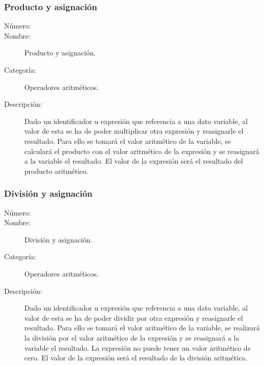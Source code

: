 \subsubsection{Producto y asignación}
\begin{framed}
	\begin{description}
		\item [Número:] \cn
		\item [Nombre:] Producto y asignación.
		\item [Categoría:] Operadores aritméticos.
		\item [Descripción:] Dado un identificador u expresión que referencia a una dato variable, al valor de esta se ha de poder multiplicar
		otra expresión y reasignarle el resultado. Para ello se tomará el valor aritmético de la variable, se calculará el producto con el valor
		aritmético de la expresión y se reasignará a la variable el resultado. El valor de la expresión será el resultado del producto aritmético.
	\end {description}
\end{framed}

\subsubsection{División y asignación}
\begin{framed}
	\begin{description}
		\item [Número:] \cn
		\item [Nombre:] División y asignación.
		\item [Categoría:] Operadores aritméticos.
		\item [Descripción:] Dado un identificador u expresión que referencia a una dato variable, al valor de esta se ha de poder dividir por
		otra expresión y reasignarle el resultado. Para ello se tomará el valor aritmético de la variable, se realizará la división por el
		valor aritmético de la expresión y se reasignará a la variable el resultado. La expresión no puede tener un valor aritmético de cero.
		El valor de la expresión será el resultado de la división aritmética.
	\end {description}
\end{framed}

